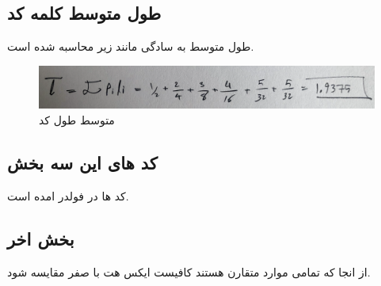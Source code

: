 \documentclass[10pt]{article}
\begin{document}
 	\subsection{طول متوسط کلمه کد}
 	طول متوسط به سادگی مانند زیر محاسبه شده است.
 	\begin{figure}[H]
 		\centering
 		\includegraphics[width=0.9\linewidth]{../img/5.4}
 		\caption{متوسط طول کد}
 		\label{fig:5-4}
 	\end{figure}
 
 	\subsection{کد های این سه بخش}
 	کد ها در فولدر 
 	امده است.
 	\subsection{بخش اخر}
 	از انجا که تمامی موارد متقارن هستند کافیست ایکس هت با صفر مقایسه شود.
\end{document}
